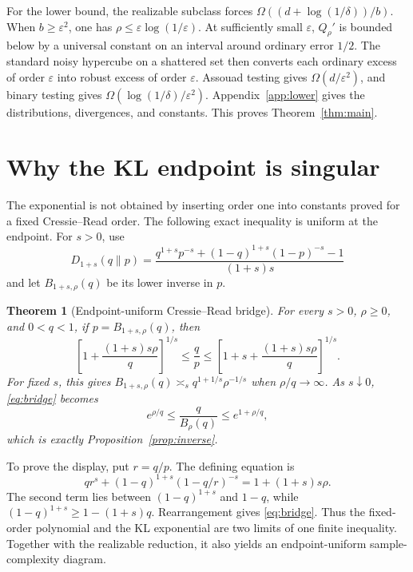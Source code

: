 \documentclass{article}
\newtheorem{theorem}{Theorem}
\theoremstyle{remark}
\newcommand{\eps}{\varepsilon}
\begin{document}
For the lower bound, the realizable subclass forces
$\Omega((d+\log(1/\delta))/b)$.  When $b\ge\eps^2$, one has
$\rho\le\eps\log(1/\eps)$.  At sufficiently small $\eps$, $Q_\rho'$ is
bounded below by a universal constant on an interval around ordinary error
$1/2$.  The standard noisy hypercube on a shattered set then converts each
ordinary excess of order $\eps$ into robust excess of order $\eps$.
Assouad testing gives $\Omega(d/\eps^2)$, and binary testing gives
$\Omega(\log(1/\delta)/\eps^2)$.  Appendix~\ref{app:lower} gives the
distributions, divergences, and constants.  This proves
Theorem~\ref{thm:main}.

\section{Why the KL endpoint is singular}
\label{sec:endpoint}

The exponential is not obtained by inserting order one into constants proved
for a fixed Cressie--Read order.  The following exact inequality is uniform at
the endpoint.  For $s>0$, use
\begin{equation}
 D_{1+s}(q\|p)=
 \frac{q^{1+s}p^{-s}+(1-q)^{1+s}(1-p)^{-s}-1}{(1+s)s}
 \label{eq:cr}
\end{equation}
and let $B_{1+s,\rho}(q)$ be its lower inverse in $p$.

\begin{theorem}[Endpoint-uniform Cressie--Read bridge]
\label{thm:bridge}
For every $s>0$, $\rho\ge0$, and $0<q<1$, if
$p=B_{1+s,\rho}(q)$, then
\begin{equation}
 \left[1+\frac{(1+s)s\rho}{q}\right]^{1/s}
 \le\frac qp\le
 \left[1+s+\frac{(1+s)s\rho}{q}\right]^{1/s}.
 \label{eq:bridge}
\end{equation}
For fixed $s$, this gives
$B_{1+s,\rho}(q)\asymp_s q^{1+1/s}\rho^{-1/s}$ when
$\rho/q\to\infty$.  As $s\downarrow0$, \eqref{eq:bridge} becomes
\begin{equation}
 e^{\rho/q}\le\frac{q}{B_\rho(q)}\le e^{1+\rho/q},
 \label{eq:bridge-limit}
\end{equation}
which is exactly Proposition~\ref{prop:inverse}.
\end{theorem}

To prove the display, put $r=q/p$.  The defining equation is
\[
 qr^s+(1-q)^{1+s}(1-q/r)^{-s}=1+(1+s)s\rho.
\]
The second term lies between $(1-q)^{1+s}$ and $1-q$, while
$(1-q)^{1+s}\ge1-(1+s)q$.  Rearrangement gives
\eqref{eq:bridge}.  Thus the fixed-order polynomial and the KL exponential
are two limits of one finite inequality.  Together with the realizable
reduction, it also yields an endpoint-uniform sample-complexity diagram.
\end{document}
